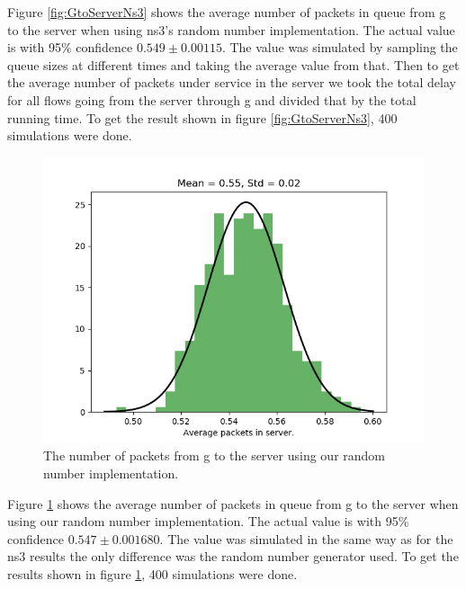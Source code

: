 \documentclass{article}
\begin{document}
Figure \ref{fig:GtoServerNs3} shows the average number of packets in queue from g to the server when using ns3's random number implementation.
The actual value is with 95\% confidence $0.549 \pm 0.00115$.
The value was simulated by sampling the queue sizes at different times and taking the average value from that.
Then to get the average number of packets under service in the server we took the total delay for all flows going from the server through g and divided that by the total running time.
To get the result shown in figure \ref{fig:GtoServerNs3}, 400 simulations were done.


\begin{figure}[!htbp]
    \centering
    \includegraphics[width=0.85\linewidth]{our_gs_queue_size.png}
    \caption{The number of packets from g to the server using our random number implementation.}
    \label{fig:GtoServerOur}
\end{figure}

Figure \ref{fig:GtoServerOur} shows the average number of packets in queue from g to the server when using our random number implementation.
The actual value is with 95\% confidence $0.547 \pm 0.001680$.
The value was simulated in the same way as for the ns3 results the only difference was the random number generator used.
To get the results shown in figure \ref{fig:GtoServerOur}, 400 simulations were done.
\end{document}
